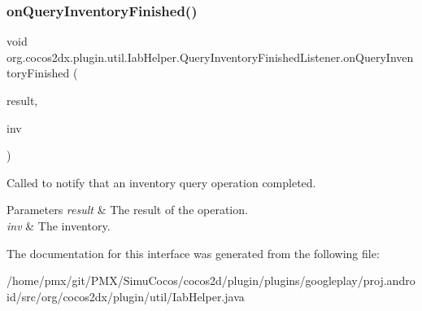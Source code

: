 \subsubsection{\texorpdfstring{on\+Query\+Inventory\+Finished()}{onQueryInventoryFinished()}}
{\footnotesize\ttfamily void org.\+cocos2dx.\+plugin.\+util.\+Iab\+Helper.\+Query\+Inventory\+Finished\+Listener.\+on\+Query\+Inventory\+Finished (\begin{DoxyParamCaption}\item[{\hyperlink{classorg_1_1cocos2dx_1_1plugin_1_1util_1_1IabResult}{Iab\+Result}}]{result,  }\item[{\hyperlink{classorg_1_1cocos2dx_1_1plugin_1_1util_1_1Inventory}{Inventory}}]{inv }\end{DoxyParamCaption})}

Called to notify that an inventory query operation completed.


\begin{DoxyParams}{Parameters}
{\em result} & The result of the operation. \\
\hline
{\em inv} & The inventory. \\
\hline
\end{DoxyParams}


The documentation for this interface was generated from the following file\+:\begin{DoxyCompactItemize}
\item 
/home/pmx/git/\+P\+M\+X/\+Simu\+Cocos/cocos2d/plugin/plugins/googleplay/proj.\+android/src/org/cocos2dx/plugin/util/Iab\+Helper.\+java\end{DoxyCompactItemize}
